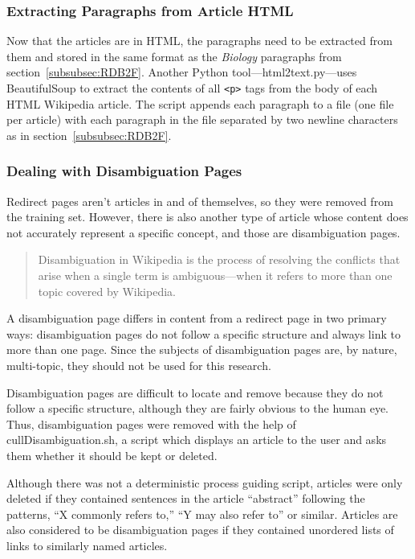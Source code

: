\subsubsection{Extracting Paragraphs from Article HTML}

Now that the articles are in HTML, the paragraphs need to be extracted from them and stored in the same format as the {\it Biology} paragraphs from section~\ref{subsubsec:RDB2F}.
Another Python tool---html2text.py---uses BeautifulSoup \cite{beautifulsoup} to extract the contents of all {\tt <p>} tags from the body of each HTML Wikipedia article.
The script appends each paragraph to a file (one file per article) with each paragraph in the file separated by two newline characters as in section~\ref{subsubsec:RDB2F}.

\subsubsection{Dealing with Disambiguation Pages}

Redirect pages aren't articles in and of themselves, so they were removed from the training set.
However, there is also another type of article whose content does not accurately represent a specific concept, and those are disambiguation pages.

\begin{quote}
Disambiguation in Wikipedia is the process of resolving the conflicts that arise when a single term is ambiguous---when it refers to more than one topic covered by Wikipedia. \cite{wiki-disambiguation}
\end{quote}

A disambiguation page differs in content from a redirect page in two primary ways: disambiguation pages do not follow a specific structure and always link to more than one page.
Since the subjects of disambiguation pages are, by nature, multi-topic, they should not be used for this research.

Disambiguation pages are difficult to locate and remove because they do not follow a specific structure, although they are fairly obvious to the human eye.
Thus, disambiguation pages were removed with the help of cullDisambiguation.sh, a script which displays an article to the user and asks them whether it should be kept or deleted.

Although there was not a deterministic process guiding script, articles were only deleted if they contained sentences in the article ``abstract'' following the patterns, ``X commonly refers to,'' ``Y may also refer to'' or similar. Articles are also considered to be disambiguation pages if they contained unordered lists of links to similarly named articles.

